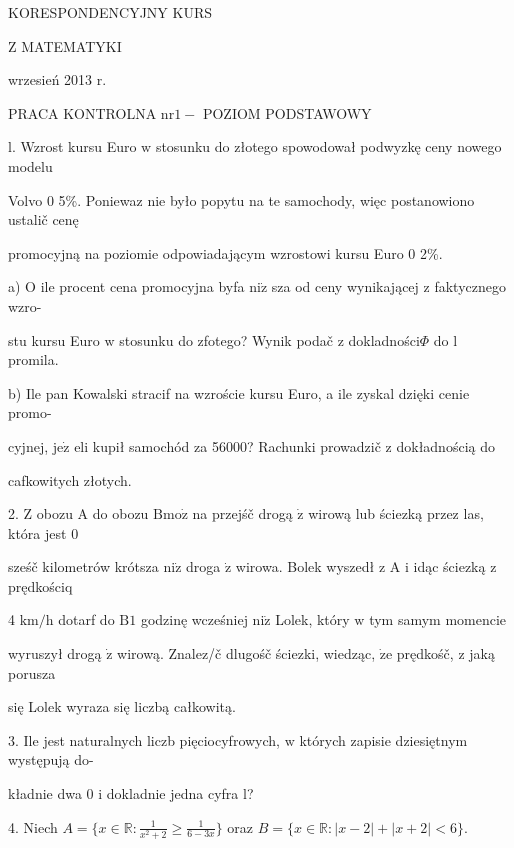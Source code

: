 \documentclass[a4paper,12pt]{article}
\begin{document}
KORESPONDENCYJNY KURS

Z MATEMATYKI

wrzesień 2013 r.

PRACA KONTROLNA $\mathrm{n}\mathrm{r} 1 -$ POZIOM PODSTAWOWY

l. Wzrost kursu Euro $\mathrm{w}$ stosunku do złotego spowodował podwyzkę ceny nowego modelu

Volvo $0$ 5\%. Poniewaz nie było popytu na te samochody, więc postanowiono ustalič cenę

promocyjną na poziomie odpowiadającym wzrostowi kursu Euro $0$ 2\%.

a) $\mathrm{O}$ ile procent cena promocyjna byfa $\mathrm{n}\mathrm{i}\dot{\mathrm{z}}$ sza od ceny wynikającej $\mathrm{z}$ faktycznego wzro-

stu kursu Euro $\mathrm{w}$ stosunku do zfotego? Wynik podač $\mathrm{z}$ dokladności$\Phi$ do l promila.

b) Ile pan Kowalski stracif na wzroście kursu Euro, a ile zyskal dzięki cenie promo-

cyjnej, $\mathrm{j}\mathrm{e}\dot{\mathrm{z}}$ eli kupił samochód za 56000? Rachunki prowadzič $\mathrm{z}$ dokładnością do

cafkowitych złotych.

2. $\mathrm{Z}$ obozu A do obozu $\mathrm{B}\mathrm{m}\mathrm{o}\dot{\mathrm{z}}$ na przejśč drogą $\dot{\mathrm{z}}$ wirową lub ściezką przez las, która jest $0$

sześč kilometrów krótsza $\mathrm{n}\mathrm{i}\dot{\mathrm{z}}$ droga $\dot{\mathrm{z}}$ wirowa. Bolek wyszedł $\mathrm{z}$ A $\mathrm{i}$ idąc ściezką $\mathrm{z}$ prędkościq

4 $\mathrm{k}\mathrm{m}/\mathrm{h}$ dotarf do $\mathrm{B} 1$ godzinę wcześniej $\mathrm{n}\mathrm{i}\dot{\mathrm{z}}$ Lolek, który $\mathrm{w}$ tym samym momencie

wyruszył drogą $\dot{\mathrm{z}}$ wirową. Znalez/č dlugośč ściezki, wiedząc, $\dot{\mathrm{z}}\mathrm{e}$ prędkośč, $\mathrm{z}$ jaką porusza

się Lolek wyraza się liczbą całkowitą.

3. Ile jest naturalnych liczb pięciocyfrowych, $\mathrm{w}$ których zapisie dziesiętnym występują do-

kładnie dwa 0 $\mathrm{i}$ dokladnie jedna cyfra l?

4. Niech $A=\displaystyle \{x\in \mathbb{R}:\frac{1}{x^{2}+2}\geq\frac{1}{6-3x}\}$ oraz $B=\{x\in \mathbb{R}:|x-2|+|x+2|<6\}.$
\end{document}
